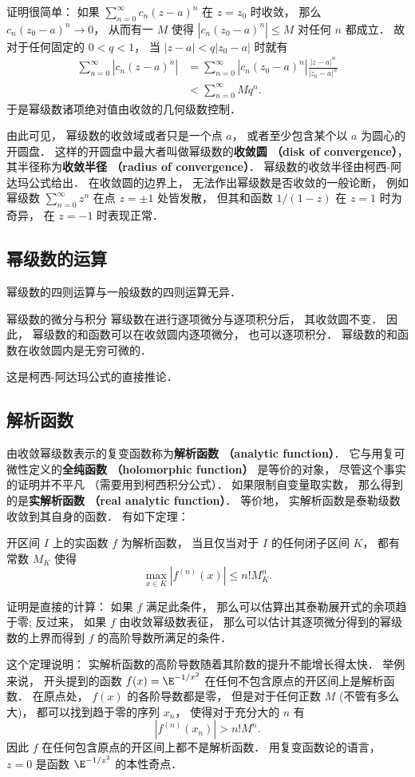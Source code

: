 证明很简单： 如果 $\sum_{n=0}^\infty c_n(z-a)^n$ 在 $z=z_0$ 时收敛， 那么 $c_n(z_0-a)^n\to0$， 从而有一 $M$ 使得 $|c_n(z_0-a)^n|\leq M$ 对任何 $n$ 都成立． 故对于任何固定的 $0<q<1$， 当 $|z-a|<q|z_0-a|$ 时就有
$$
\begin{aligned}
\sum_{n=0}^\infty |c_n(z-a)^n|
&=\sum_{n=0}^\infty |c_n(z_0-a)^n|\frac{|z-a|^n}{|z_0-a|^n}\\
&<\sum_{n=0}^\infty Mq^n.
\end{aligned}
$$
于是幂级数诸项绝对值由收敛的几何级数控制．

由此可见， 幂级数的收敛域或者只是一个点 $a$， 或者至少包含某个以 $a$ 为圆心的开圆盘． 这样的开圆盘中最大者叫做幂级数的\textbf{收敛圆 （disk of convergence）}， 其半径称为\textbf{收敛半径 （radius of convergence）}． 幂级数的收敛半径由柯西-阿达玛公式给出． 在收敛圆的边界上， 无法作出幂级数是否收敛的一般论断， 例如幂级数 $\sum_{n=0}^\infty z^n$ 在点 $z=\pm1$ 处皆发散， 但其和函数 $1/(1-z)$ 在 $z=1$ 时为奇异， 在 $z=-1$ 时表现正常．

\subsection{幂级数的运算}
幂级数的四则运算与一般级数的四则运算无异．

\begin{theorem}{幂级数的微分与积分}
幂级数在进行逐项微分与逐项积分后， 其收敛圆不变． 因此， 幂级数的和函数可以在收敛圆内逐项微分， 也可以逐项积分． 幂级数的和函数在收敛圆内是无穷可微的．
\end{theorem}
这是柯西-阿达玛公式的直接推论． 

\subsection{解析函数}
由收敛幂级数表示的复变函数称为\textbf{解析函数 （analytic function）}． 它与用复可微性定义的\textbf{全纯函数 （holomorphic function）} 是等价的对象， 尽管这个事实的证明并不平凡 （需要用到柯西积分公式）． 如果限制自变量取实数， 那么得到的是\textbf{实解析函数 （real analytic function）}． 等价地， 实解析函数是泰勒级数收敛到其自身的函数． 有如下定理：

\begin{theorem}{}
开区间 $I$ 上的实函数 $f$ 为解析函数， 当且仅当对于 $I$ 的任何闭子区间 $K$， 都有常数 $M_K$ 使得
$$
\max_{x\in K}|f^{(n)}(x)|\leq n!M_K^n.
$$
\end{theorem}

证明是直接的计算： 如果 $f$ 满足此条件， 那么可以估算出其泰勒展开式的余项趋于零; 反过来， 如果 $f$ 由收敛幂级数表征， 那么可以估计其逐项微分得到的幂级数的上界而得到 $f$ 的高阶导数所满足的条件．

这个定理说明： 实解析函数的高阶导数随着其阶数的提升不能增长得太快． 举例来说， 开头提到的函数 $f(x)=\E^{-1/x^2}$ 在任何不包含原点的开区间上是解析函数． 在原点处， $f(x)$ 的各阶导数都是零， 但是对于任何正数 $M$ (不管有多么大)， 都可以找到趋于零的序列 $x_n$， 使得对于充分大的 $n$ 有
$$
|f^{(n)}(x_n)|>n!M^n.
$$
因此 $f$ 在任何包含原点的开区间上都不是解析函数． 用复变函数论的语言， $z=0$ 是函数 $\E^{-1/z^2}$ 的本性奇点．


